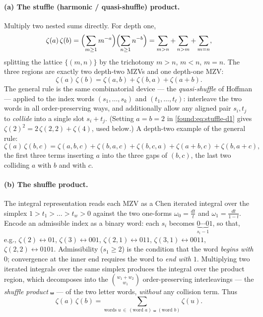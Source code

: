 \paragraph{(a) The stuffle (harmonic / quasi-shuffle) product.}
Multiply two nested sums directly. For depth one,
\[
  \zeta(a)\,\zeta(b)=\Bigl(\sum_{m\ge1}m^{-a}\Bigr)\Bigl(\sum_{n\ge1}n^{-b}\Bigr)
  =\sum_{m>n}+\sum_{n>m}+\sum_{m=n},
\]
splitting the lattice $\{(m,n)\}$ by the trichotomy $m>n$, $m<n$, $m=n$. The three regions are exactly two depth-two MZVs and one depth-one MZV:
\begin{equation}
  \zeta(a)\,\zeta(b)=\zeta(a,b)+\zeta(b,a)+\zeta(a+b).
  \label{found:eq:stuffle-d1}
\end{equation}
The general rule is the same combinatorial device --- the \emph{quasi-shuffle} of Hoffman --- applied to the index words $(s_1,\dots,s_k)$ and $(t_1,\dots,t_\ell)$: interleave the two words in all order-preserving ways, and additionally allow any aligned pair $s_i,t_j$ to \emph{collide} into a single slot $s_i+t_j$. (Setting $a=b=2$ in \eqref{found:eq:stuffle-d1} gives $\zeta(2)^2=2\,\zeta(2,2)+\zeta(4)$, used below.) A depth-two example of the general rule:
\[
  \zeta(a)\,\zeta(b,c)=\zeta(a,b,c)+\zeta(b,a,c)+\zeta(b,c,a)
  +\zeta(a+b,c)+\zeta(b,a+c),
\]
the first three terms inserting $a$ into the three gaps of $(b,c)$, the last two colliding $a$ with $b$ and with $c$.

\paragraph{(b) The shuffle product.}
The integral representation reads each MZV as a Chen iterated integral over the simplex $1>t_1>\dots>t_w>0$ against the two one-forms $\omega_0=\tfrac{dt}{t}$ and $\omega_1=\tfrac{dt}{1-t}$. Encode an admissible index as a binary word: each $s_i$ becomes $\underbrace{0\cdots0}_{s_i-1}1$, so that, e.g., $\zeta(2)\leftrightarrow 01$, $\zeta(3)\leftrightarrow 001$, $\zeta(2,1)\leftrightarrow 011$, $\zeta(3,1)\leftrightarrow 0011$, $\zeta(2,2)\leftrightarrow 0101$. Admissibility ($s_1\ge2$) is the condition that the word \emph{begins with $0$}; convergence at the inner end requires the word to \emph{end with $1$}. Multiplying two iterated integrals over the same simplex produces the integral over the product region, which decomposes into the $\binom{w_1+w_2}{w_1}$ order-preserving interleavings --- the \emph{shuffle product} $\shuffle$ --- of the two letter words, \emph{without} any collision term. Thus
\begin{equation}
  \zeta(a)\,\zeta(b)=\sum_{\text{words }u\,\in\,(\text{word }a)\,\shuffle\,(\text{word }b)}\zeta(u).
  \label{found:eq:shuffle-gen}
\end{equation}

